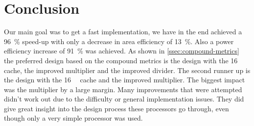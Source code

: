 \documentclass[final]{article}
\begin{document}
\section{Conclusion}
\label{sec:conclusion}
Our main goal was to get a fast implementation, we have in the end achieved a \SI{96}{\percent} speed-up with only a decrease in area efficiency of \SI{13}{\percent}.
Also a power efficiency increase of \SI{91}{\percent} was achieved.
As shown in \cref{ssec:compound-metrics} the preferred design based on the compound metrics is the design with the \SI{16}{\kibi\byte} cache, the improved multiplier and the improved divider.
The second runner up is the design with the \SI{16}{\kibi\byte} cache and the improved multiplier.
The biggest impact was the multiplier by a large margin.
Many improvements that were attempted didn't work out due to the difficulty or general implementation issues.
They did give great insight into the design process these processors go through, even though only a very simple processor was used.
\end{document}
